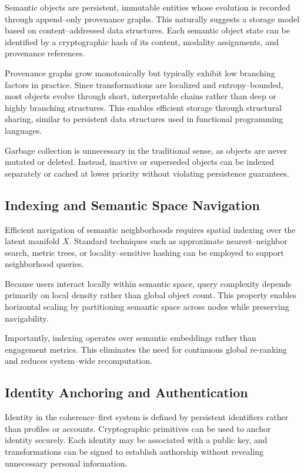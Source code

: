 \documentclass[11pt]{article}
\begin{document}
Semantic objects are persistent, immutable entities whose evolution is recorded through
append--only provenance graphs. This naturally suggests a storage model based on
content--addressed data structures. Each semantic object state can be identified by a
cryptographic hash of its content, modality assignments, and provenance references.

Provenance graphs grow monotonically but typically exhibit low branching factors in
practice. Since transformations are localized and entropy--bounded, most objects evolve
through short, interpretable chains rather than deep or highly branching structures. This
enables efficient storage through structural sharing, similar to persistent data
structures used in functional programming languages.

Garbage collection is unnecessary in the traditional sense, as objects are never mutated
or deleted. Instead, inactive or superseded objects can be indexed separately or cached at
lower priority without violating persistence guarantees.

\subsection{Indexing and Semantic Space Navigation}

Efficient navigation of semantic neighborhoods requires spatial indexing over the latent
manifold $X$. Standard techniques such as approximate nearest--neighbor search, metric
trees, or locality--sensitive hashing can be employed to support neighborhood queries.

Because users interact locally within semantic space, query complexity depends primarily
on local density rather than global object count. This property enables horizontal scaling
by partitioning semantic space across nodes while preserving navigability.

Importantly, indexing operates over semantic embeddings rather than engagement metrics.
This eliminates the need for continuous global re-ranking and reduces system--wide
recomputation.

\subsection{Identity Anchoring and Authentication}

Identity in the coherence--first system is defined by persistent identifiers rather than
profiles or accounts. Cryptographic primitives can be used to anchor identity securely.
Each identity may be associated with a public key, and transformations can be signed to
establish authorship without revealing unnecessary personal information.
\end{document}
